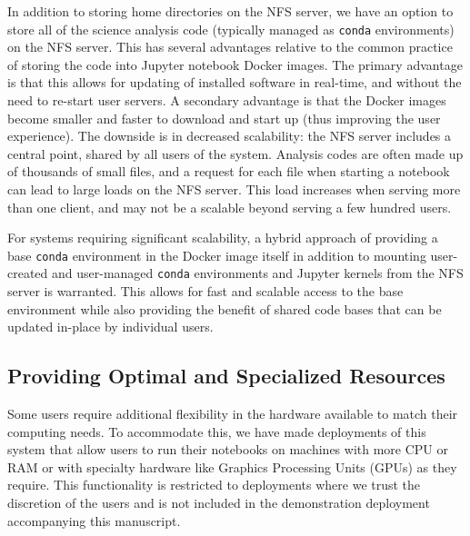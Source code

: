 \documentclass[twocolumn, linenumbers]{aastex631}
\begin{document}
In addition to storing home directories on the NFS server, we have an option to store all of the science analysis code (typically managed as \texttt{conda} environments) on the NFS server. This has several advantages relative to the common practice of storing the code into Jupyter notebook Docker images. The primary advantage is that this allows for updating of installed software in real-time, and without the need to re-start user servers. A secondary advantage is that the Docker images become smaller and faster to download and start up (thus improving the user experience). The downside is in decreased scalability: the NFS server includes a central point, shared by all users of the system. Analysis codes are often made up of thousands of small files, and a request for each file when starting a notebook can lead to large loads on the NFS server. This load increases when serving more than one client, and may not be a scalable beyond serving a few hundred users.

For systems requiring significant scalability, a hybrid approach of providing a base \texttt{conda} environment in the Docker image itself in addition to mounting user-created and user-managed \texttt{conda} environments and Jupyter kernels from the NFS server is warranted. This allows for fast and scalable access to the base environment while also providing the benefit of shared code bases that can be updated in-place by individual users.

\subsection{Providing Optimal and Specialized Resources}
\label{sec:resources}

Some users require additional flexibility in the hardware available to match their computing needs. To accommodate this, we have made deployments of this system that allow users to run their notebooks on machines with more CPU or RAM or with specialty hardware like Graphics Processing Units (GPUs) as they require. This functionality is restricted to deployments where we trust the discretion of the users and is not included in the demonstration deployment accompanying this manuscript.
\end{document}
